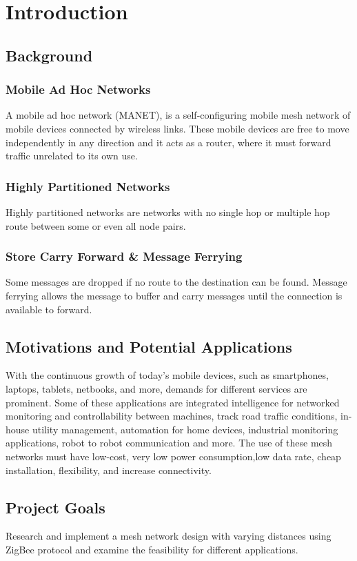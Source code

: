 \chapter{Introduction} 

\section{Background}

\subsection{Mobile Ad Hoc Networks}
A mobile ad hoc network (MANET),  is a self-configuring mobile mesh network of mobile devices connected by wireless links.  
These mobile devices are free to move independently in any direction and it acts as a router, where it must forward traffic unrelated to its own use. 

\subsection{Highly Partitioned Networks}
Highly partitioned networks are networks with no single hop or multiple hop route between some or even all node pairs.

\subsection{Store Carry Forward & Message Ferrying}
Some messages are dropped if no route to the destination can be found.  Message ferrying allows the message to buffer and carry messages until the connection is available to forward.

\section{Motivations and Potential Applications}

With the continuous growth of today's mobile devices, such as smartphones, laptops, tablets, netbooks, and more, demands for different services are prominent. 
Some of these applications are integrated intelligence for networked monitoring and controllability between machines, track road traffic conditions, in-house utility management, automation for home devices, industrial monitoring applications, robot to robot communication and more.  The use of these mesh networks must have low-cost, very low power consumption,low data rate, cheap installation, flexibility, and increase connectivity.




\section{Project Goals}
Research and implement a mesh network design with varying distances using ZigBee protocol and examine the feasibility for different applications.
